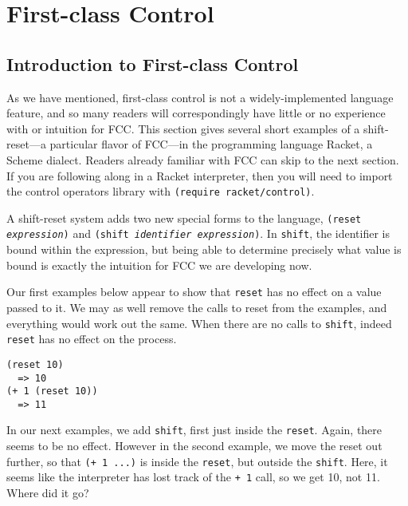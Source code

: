 \documentclass[11pt]{article}
\begin{document}
%


\section{First-class Control}
\label{sec:FCC}

\subsection{Introduction to First-class Control}
\label{subsec:intro-to-fcc}

As we have mentioned, first-class control is not a widely-implemented language feature, and so many readers will correspondingly have little or no experience with or intuition for FCC.
This section gives several short examples of a shift-reset---a particular flavor of FCC---in the programming language Racket, a Scheme dialect.
Readers already familiar with FCC can skip to the next section.
If you are following along in a Racket interpreter, then you will need to import the control operators library with \texttt{(require racket/control)}.

A shift-reset system adds two new special forms to the language, \texttt{(reset \textit{expression})} and \texttt{(shift \textit{identifier expression})}.
In \texttt{shift}, the identifier is bound within the expression, but being able to determine precisely what value is bound is exactly the intuition for FCC we are developing now.

Our first examples below appear to show that \texttt{reset} has no effect on a value passed to it.
We may as well remove the calls to reset from the examples, and everything would work out the same.
When there are no calls to \texttt{shift}, indeed \texttt{reset} has no effect on the process.

\begin{verbatim}
(reset 10)
  => 10
(+ 1 (reset 10))
  => 11
\end{verbatim}

In our next examples, we add \texttt{shift}, first just inside the \texttt{reset}.
Again, there seems to be no effect.
However in the second example, we move the reset out further, so that \texttt{(+ 1 ...)} is inside the \texttt{reset}, but outside the \texttt{shift}.
Here, it seems like the interpreter has lost track of the \texttt{+ 1} call, so we get 10, not 11.
Where did it go?
\end{document}
